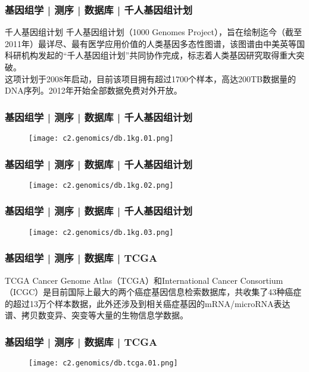 \begin{frame}
  \frametitle{基因组学 | 测序 | 数据库 | 千人基因组计划}
  \begin{block}{千人基因组计划}
千人基因组计划（1000 Genomes Project），旨在绘制迄今（截至2011年）最详尽、最有医学应用价值的人类基因多态性图谱，该图谱由中美英等国科研机构发起的“千人基因组计划”共同协作完成，标志着人类基因研究取得重大突破。\\
\vspace{1em}
这项计划于2008年启动，目前该项目拥有超过1700个样本，高达200TB数据量的DNA序列。2012年开始全部数据免费对外开放。
  \end{block}
\end{frame}
    
\begin{frame}
  \frametitle{基因组学 | 测序 | 数据库 | 千人基因组计划}
  \begin{figure}
    \centering
    \texttt{[image: c2.genomics/db.1kg.01.png]}
  \end{figure}
\end{frame}
    
\begin{frame}
  \frametitle{基因组学 | 测序 | 数据库 | 千人基因组计划}
  \begin{figure}
    \centering
    \texttt{[image: c2.genomics/db.1kg.02.png]}
  \end{figure}
\end{frame}
    
\begin{frame}
  \frametitle{基因组学 | 测序 | 数据库 | 千人基因组计划}
  \begin{figure}
    \centering
    \texttt{[image: c2.genomics/db.1kg.03.png]}
  \end{figure}
\end{frame}
    
\begin{frame}
  \frametitle{基因组学 | 测序 | 数据库 | TCGA}
  \begin{block}{TCGA}
Cancer Genome Atlas（TCGA）和International Cancer Consortium（ICGC）是目前国际上最大的两个癌症基因信息检索数据库，共收集了43种癌症的超过13万个样本数据，此外还涉及到相关癌症基因的mRNA/microRNA表达谱、拷贝数变异、突变等大量的生物信息学数据。
  \end{block}
\end{frame}

\begin{frame}
  \frametitle{基因组学 | 测序 | 数据库 | TCGA}
  \begin{figure}
    \centering
    \texttt{[image: c2.genomics/db.tcga.01.png]}
  \end{figure}
\end{frame}
    
